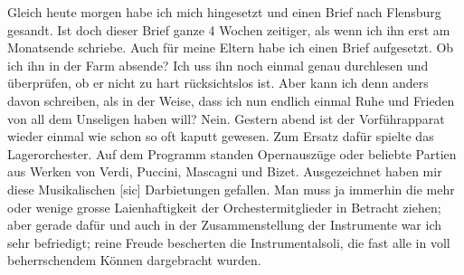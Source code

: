 \def\day{2. November 1942}
\mktitle

Gleich heute morgen habe ich mich hingesetzt und einen Brief nach Flensburg gesandt.
Ist doch dieser Brief ganze 4 Wochen zeitiger, als wenn ich ihn erst am Monatsende schriebe.
Auch f\"{u}r meine Eltern habe ich einen Brief aufgesetzt.
Ob ich ihn in der Farm absende?
Ich uss ihn noch einmal genau durchlesen und \"{u}berpr\"{u}fen, ob er nicht zu hart r\"{u}cksichtslos ist.
Aber kann ich denn anders davon schreiben, als in der Weise, dass ich nun endlich einmal Ruhe und Frieden von all dem Unseligen haben will?
Nein.
Gestern abend ist der Vorf\"{u}hrapparat wieder einmal wie schon so oft kaputt gewesen.
Zum Ersatz daf\"{u}r spielte das Lagerorchester.
Auf dem Programm standen Opernausz\"{u}ge oder beliebte Partien aus Werken von Verdi, Puccini, Mascagni und Bizet.
Ausgezeichnet haben mir diese Musikalischen{\color{red} [sic] } Darbietungen gefallen.
Man muss ja immerhin die mehr oder wenige grosse Laienhaftigkeit der Orchestermitglieder in Betracht ziehen; aber gerade daf\"{u}r und auch in der Zusammenstellung der Instrumente war ich sehr befriedigt; reine Freude bescherten die Instrumentalsoli, die fast alle in voll beherrschendem K\"{o}nnen dargebracht wurden.

\clearpage

